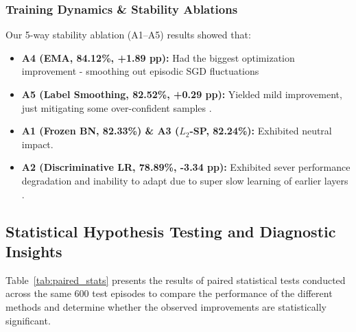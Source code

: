 \documentclass[conference]{IEEEtran}
\begin{document}
\subsubsection{Training Dynamics \& Stability Ablations}
Our 5-way stability ablation (A1--A5) results showed that:
\begin{itemize}
    \item \textbf{A4 (EMA, 84.12\%, +1.89 pp):} Had the biggest optimization improvement - smoothing out episodic SGD fluctuations
    \item \textbf{A5 (Label Smoothing, 82.52\%, +0.29 pp):} Yielded mild improvement, just mitigating some over-confident samples .
    \item \textbf{A1 (Frozen BN, 82.33\%) \& A3 ($L_2$-SP, 82.24\%):} Exhibited neutral impact.
    \item \textbf{A2 (Discriminative LR, 78.89\%, -3.34 pp):} Exhibited sever performance degradation and inability to adapt due to super slow learning  of earlier layers .
\end{itemize}


\subsection{Statistical Hypothesis Testing and Diagnostic Insights}
Table~\ref{tab:paired_stats} presents the results of paired statistical tests conducted across the same 600 test episodes to compare the performance of the different methods and determine whether the observed improvements are statistically significant.
\begin{table}[h]
\centering
\caption{Paired Head-to-Head Hypothesis Testing Across 600 Episodes.}
\label{tab:paired_stats}
\end{table}
\end{document}
